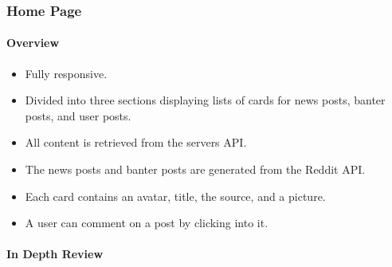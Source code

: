 \subsubsection{Home Page}
\paragraph{Overview\newline}
\begin{itemize}
    \item Fully responsive.
    \item Divided into three sections displaying lists of cards for news posts, banter posts, and user posts.
    \item All content is retrieved from the servers API.
    \item The news posts and banter posts are generated from the Reddit API.
    \item Each card contains an avatar, title, the source, and a picture.
    \item A user can comment on a post by clicking into it.
\end{itemize}

\paragraph{In Depth Review\newline}

